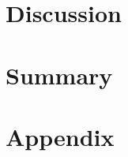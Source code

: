 \documentclass[%
 reprint,
 amsmath,amssymb,
 aps,
]{revtex4-1}
\begin{document}
\section{Discussion}

\section{Summary}
\section{Appendix}
\newpage


\end{document}
